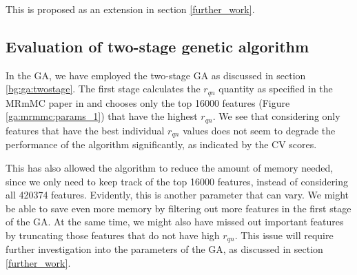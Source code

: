 \documentclass[12pt, twoside, a4paper]{report}
\begin{document}
This is proposed as an extension in section \ref{further_work}.

\subsection{Evaluation of two-stage genetic algorithm}

In the GA, we have employed the two-stage GA as discussed in section \ref{bg:ga:twostage}. The first stage calculates the $r_{qn}$ quantity as specified in the MRmMC paper in \cite{RefWorks:187} and chooses only the top 16000 features (Figure \ref{ga:mrmmc:params_1}) that have the highest $r_{qn}$. We see that considering only features that have the best individual $r_{qn}$ values does not seem to degrade the performance of the algorithm significantly, as indicated by the CV scores.

This has also allowed the algorithm to reduce the amount of memory needed, since we only need to keep track of the top 16000 features, instead of considering all 420374 features. Evidently, this is another parameter that can vary. We might be able to save even more memory by filtering out more features in the first stage of the GA. At the same time, we might also have missed out important features by truncating those features that do not have high $r_{qn}$. This issue will require further investigation into the parameters of the GA, as discussed in section \ref{further_work}.





\end{document}
